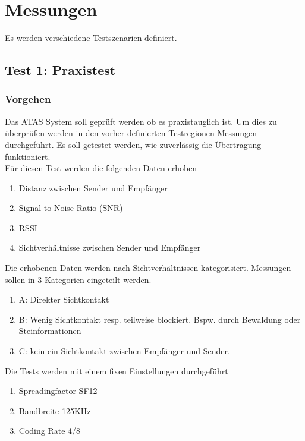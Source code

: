 \documentclass[11pt,english,german]{report}
\theoremstyle{definition}
\begin{document}
\newpage
\section{Messungen}
Es werden verschiedene Testszenarien definiert.

\subsection{Test 1: Praxistest}
\subsubsection{Vorgehen}
Das ATAS System soll geprüft werden ob es praxistauglich ist. Um dies zu überprüfen werden in den vorher definierten Testregionen Messungen durchgeführt. Es soll getestet werden, wie zuverlässig die Übertragung funktioniert.\\[0.3cm]
Für diesen Test werden die folgenden Daten erhoben
\begin{enumerate}
	\item Distanz zwischen Sender und Empfänger
	\item Signal to Noise Ratio (SNR)
	\item RSSI
	\item Sichtverhältnisse zwischen Sender und Empfänger
\end{enumerate}	
Die erhobenen Daten werden nach Sichtverhältnissen kategorisiert. Messungen sollen in 3 Kategorien eingeteilt werden.
\begin{enumerate}
	\item A: Direkter Sichtkontakt
	\item B: Wenig Sichtkontakt resp. teilweise blockiert. Bspw. durch Bewaldung oder Steinformationen
	\item C: kein ein Sichtkontakt zwischen Empfänger und Sender.
\end{enumerate}
Die Tests werden mit einem fixen Einstellungen durchgeführt
\begin{enumerate}
	\item Spreadingfactor SF12
	\item Bandbreite 125KHz
	\item Coding Rate 4/8
\end{enumerate}
\newpage
\end{document}
